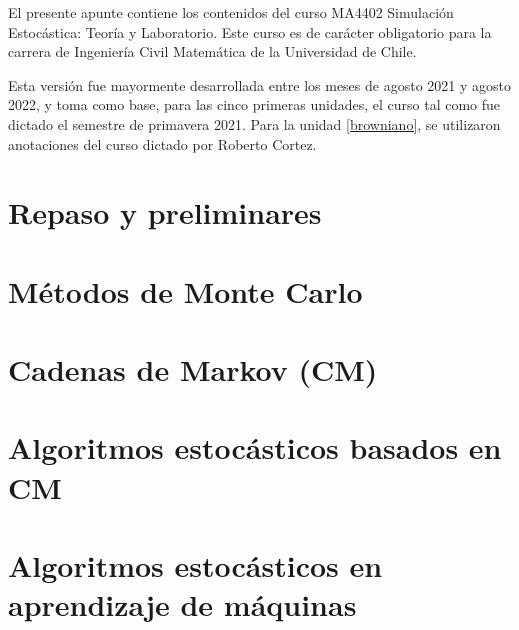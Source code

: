 \documentclass[letterpaper,11pt]{article} %
\theoremstyle{defbreak}
\theoremstyle{propbreak}
\theoremstyle{remark}
\theoremstyle{break}
\begin{document}
	



El presente apunte contiene los contenidos del curso MA4402 Simulación Estocástica: Teoría y Laboratorio. Este curso es de carácter obligatorio para la carrera de Ingeniería Civil Matemática de la Universidad de Chile.

\newp Esta versión fue mayormente desarrollada entre los meses de agosto 2021 y agosto 2022, y toma como base, para las cinco primeras unidades, el curso tal como fue dictado el semestre de primavera 2021. Para la unidad \ref{browniano}, se utilizaron anotaciones del curso dictado por Roberto Cortez.

\newpage




\section{Repaso y preliminares}


\newpage
\section{Métodos de Monte Carlo}



\newpage
\section{Cadenas de Markov (CM)}


\newpage
\section{Algoritmos estocásticos basados en CM}


\newpage
\section{Algoritmos estocásticos en aprendizaje de máquinas}

\end{document}
